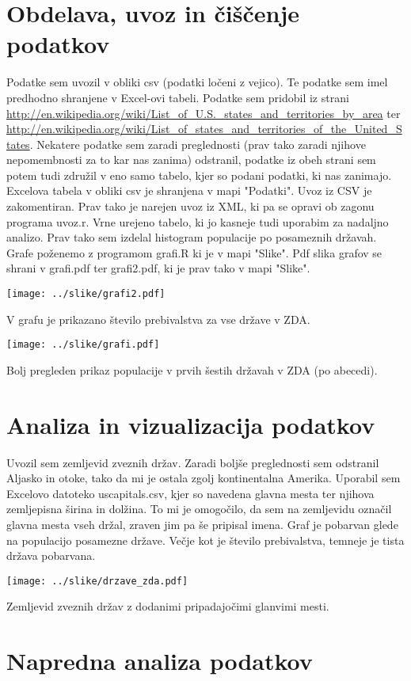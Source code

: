 \documentclass[11pt,a4paper]{article}
\begin{document}
\pagebreak

\section{Obdelava, uvoz in čiščenje podatkov}

Podatke sem uvozil v obliki csv (podatki ločeni z vejico). Te podatke sem imel predhodno shranjene v Excel-ovi tabeli. Podatke sem pridobil iz strani 
\url{http://en.wikipedia.org/wiki/List_of_U.S._states_and_territories_by_area} ter
\url{http://en.wikipedia.org/wiki/List_of_states_and_territories_of_the_United_States}. 
Nekatere podatke sem zaradi preglednosti (prav tako zaradi njihove nepomembnosti za to kar nas zanima) odstranil, podatke iz obeh strani sem potem tudi združil v eno samo tabelo, kjer so podani podatki, ki nas zanimajo. Excelova tabela v obliki csv je shranjena v mapi "Podatki".
Uvoz iz CSV je zakomentiran.
Prav tako je narejen uvoz iz XML, ki pa se opravi ob zagonu programa uvoz.r. Vrne urejeno tabelo, ki jo kasneje tudi uporabim za nadaljno analizo.
Prav tako sem izdelal histogram populacije po posameznih državah.
Grafe poženemo z programom grafi.R ki je v mapi "Slike". Pdf slika grafov se shrani v 
grafi.pdf ter grafi2.pdf,  ki je prav tako v mapi "Slike".

\vfill
\texttt{[image: ../slike/grafi2.pdf]}

V grafu je prikazano število prebivalstva za vse države v ZDA.


\texttt{[image: ../slike/grafi.pdf]}

Bolj pregleden prikaz populacije v prvih šestih državah v ZDA (po abecedi).

\pagebreak

\section{Analiza in vizualizacija podatkov}

Uvozil sem zemljevid zveznih držav. Zaradi boljše preglednosti sem odstranil Aljasko in otoke, tako da mi je ostala zgolj kontinentalna Amerika. Uporabil sem Excelovo datoteko uscapitals.csv, kjer so navedena glavna mesta ter njihova zemljepisna širina in dolžina. To mi je omogočilo, da sem na zemljevidu označil glavna mesta vseh držal, zraven jim pa še pripisal imena. Graf je pobarvan glede na populacijo posamezne države. Večje kot je število prebivalstva, temneje je tista država pobarvana.

\texttt{[image: ../slike/drzave\_zda.pdf]}

Zemljevid zveznih držav z dodanimi pripadajočimi glanvimi mesti.

\newpage
\section{Napredna analiza podatkov}
\end{document}
